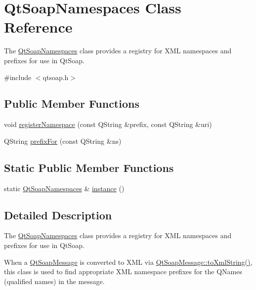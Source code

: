 \hypertarget{class_qt_soap_namespaces}{}\section{Qt\+Soap\+Namespaces Class Reference}
\label{class_qt_soap_namespaces}


The \mbox{\hyperlink{class_qt_soap_namespaces}{Qt\+Soap\+Namespaces}} class provides a registry for X\+ML namespaces and prefixes for use in Qt\+Soap.  




{\ttfamily \#include $<$qtsoap.\+h$>$}

\subsection*{Public Member Functions}
\begin{DoxyCompactItemize}
\item 
void \mbox{\hyperlink{class_qt_soap_namespaces_aef73fe57357526093afb3fa423c3599c}{register\+Namespace}} (const Q\+String \&prefix, const Q\+String \&uri)
\item 
Q\+String \mbox{\hyperlink{class_qt_soap_namespaces_a745c4bc78333d1ee9d0c01efc38c5937}{prefix\+For}} (const Q\+String \&ns)
\end{DoxyCompactItemize}
\subsection*{Static Public Member Functions}
\begin{DoxyCompactItemize}
\item 
static \mbox{\hyperlink{class_qt_soap_namespaces}{Qt\+Soap\+Namespaces}} \& \mbox{\hyperlink{class_qt_soap_namespaces_ab859916f047d88209d505942232d99f5}{instance}} ()
\end{DoxyCompactItemize}


\subsection{Detailed Description}
The \mbox{\hyperlink{class_qt_soap_namespaces}{Qt\+Soap\+Namespaces}} class provides a registry for X\+ML namespaces and prefixes for use in Qt\+Soap. 

When a \mbox{\hyperlink{class_qt_soap_message}{Qt\+Soap\+Message}} is converted to X\+ML via \mbox{\hyperlink{class_qt_soap_message_a5c9c6997f2ee1b35bf73a7988ef87213}{Qt\+Soap\+Message\+::to\+Xml\+String()}}, this class is used to find appropriate X\+ML namespace prefixes for the Q\+Names (qualified names) in the message.

